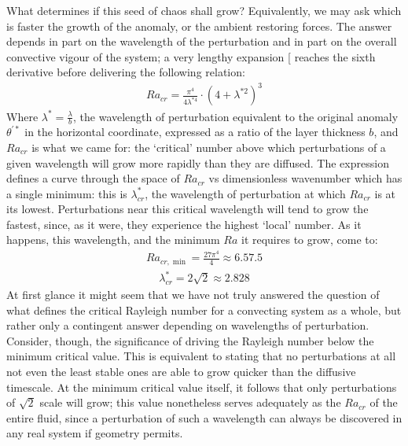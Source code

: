 \documentclass[letterpaper,10pt,english]{jupyterBook}
\begin{document}
\sphinxAtStartPar
What determines if this seed of chaos shall grow? Equivalently, we may ask which is faster \sphinxhyphen{} the growth of the anomaly, or the ambient restoring forces. The answer depends in part on the wavelength of the perturbation and in part on the overall convective vigour of the system; a very lengthy expansion {[}\sphinxcite{references:id89}{]} reaches the sixth derivative before delivering the following relation:
\begin{equation*}
\begin{split} Ra_{cr} = \frac{\pi^4}{4\lambda^{*4}} \cdot \left( 4 + \lambda^{*2} \right) ^3 \end{split}
\end{equation*}
\sphinxAtStartPar
Where \(\lambda^*=\frac{\lambda}{b}\), the wavelength of perturbation equivalent to the original anomaly \(\theta^{'*}\) in the horizontal coordinate, expressed as a ratio of the layer thickness \(b\), and \(Ra_{cr}\) is what we came for: the ‘critical’  number above which perturbations of a given wavelength will grow more rapidly than they are diffused. The expression defines a curve through the space of \(Ra_{cr}\) vs dimensionless wavenumber which has a single minimum: this is \(\lambda^*_{cr}\), the wavelength of perturbation at which \(Ra_{cr}\) is at its lowest. Perturbations near this critical wavelength will tend to grow the fastest, since, as it were, they experience the highest ‘local’  number. As it happens, this wavelength, and the minimum \(Ra\) it requires to grow, come to:
\begin{equation*}
\begin{split} Ra_{cr, \min} = \frac{27\pi^4}{4} \approx 6.57.5 \end{split}
\end{equation*}\begin{equation*}
\begin{split} \lambda_{cr}^* = 2 \sqrt{2} \approx 2.828 \end{split}
\end{equation*}
\sphinxAtStartPar
At first glance it might seem that we have not truly answered the question of what defines the critical Rayleigh number for a convecting system as a whole, but rather only a contingent answer depending on wavelengths of perturbation. Consider, though, the significance of driving the Rayleigh number below the minimum critical value. This is equivalent to stating that no perturbations at all \sphinxhyphen{} not even the least stable ones \sphinxhyphen{} are able to grow quicker than the diffusive timescale. At the minimum critical value itself, it follows that only perturbations of \(\sqrt{2}\) scale will grow; this value nonetheless serves adequately as the \(Ra_{cr}\) of the entire fluid, since a perturbation of such a wavelength can always be discovered in any real system \sphinxhyphen{} if geometry permits.
\end{document}
